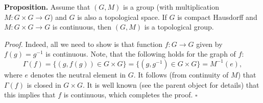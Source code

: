 \documentclass[12pt]{article}
\begin{document}
\textbf{Proposition.} Assume that $(G,M)$ is a group (with multiplication $M:G\times G\to G$) and $G$ is also a topological space. If $G$ is compact Hausdorff and $M:G\times G\to G$ is continuous, then $(G,M)$ is a topological group.

\textit{Proof.} Indeed, all we need to show is that function $f:G\to G$ given by $f(g)=g^{-1}$ is continuous. Note, that the following holds for the graph of $f$:
$$\Gamma(f)=\{(g,f(g))\in G\times G\}=\{(g,g^{-1})\in G\times G\} = M^{-1}(e),$$
where $e$ denotes the neutral element in $G$. It follows (from continuity of $M$) that $\Gamma(f)$ is closed in $G\times G$. It is well known (see the parent object for details) that this implies that $f$ is continuous, which completes the proof. $\square$
\end{document}
